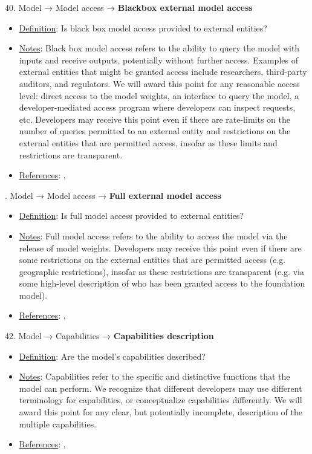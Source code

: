 40. Model → Model access → \textbf{Blackbox external model access}
\vspace{-\parskip}
\begin{itemize}
	\item
	\underline{Definition}: Is black box model access provided to external entities?
	\item
	\underline{Notes}: Black box model access refers to the ability to query the model with inputs and receive outputs, potentially without further access. Examples of external entities that might be granted access include researchers, third-party auditors, and regulators. We will award this point for any reasonable access level: direct access to the model weights, an interface to query the model, a developer-mediated access program where developers can inspect requests, etc. Developers may receive this point even if there are rate-limits on the number of queries permitted to an external entity and restrictions on the external entities that are permitted access, insofar as these limits and restrictions are transparent.
	\item
	\underline{References}: \citet{solaiman2023gradient}, \citet{shevlane2022structured}
\end{itemize}


. Model → Model access → \textbf{Full external model access}
\vspace{-\parskip}
\begin{itemize}
	\item
	\underline{Definition}: Is full model access provided to external entities?
	\item
	\underline{Notes}: Full model access refers to the ability to access the model via the release of model weights. Developers may receive this point even if there are some restrictions on the external entities that are permitted access (e.g. geographic restrictions), insofar as these restrictions are transparent (e.g. via some high-level description of who has been granted access to the foundation model).
	\item
	\underline{References}: \citet{solaiman2023gradient}, \citet{shevlane2022structured}
\end{itemize}


42. Model → Capabilities → \textbf{Capabilities description}
\vspace{-\parskip}
\begin{itemize}
	\item
	\underline{Definition}: Are the model's capabilities described?
	\item
	\underline{Notes}: Capabilities refer to the specific and distinctive functions that the model can perform. We recognize that different developers may use different terminology for capabilities, or conceptualize capabilities differently. We will award this point for any clear, but potentially incomplete, description of the multiple capabilities.
	\item
	\underline{References}: \citet{srivastava2022bigbench}, \citet{liang2022helm}
\end{itemize}


